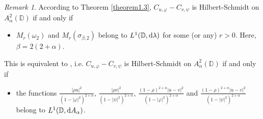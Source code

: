 \documentclass[preprint,12pt,times]{elsarticle}
\theoremstyle{definition}
\theoremstyle{remark}
\newtheorem{remark}[theorem]{Remark}
\numberwithin{equation}{section}
\begin{document}
\begin{remark}\label{remark4.1}
According to Theorem \ref{theorem1.3}, $C_{u,\varphi}-C_{v,\psi}$ is Hilbert-Schmidt on $A_{\alpha}^2(\mathbb{D})$ if and only if
\begin{itemize}
\item[(a)] $M_r(\omega_{2})$ and $M_r(\sigma_{\beta,2})$ belong to $L^1(\mathbb{D},{\rm d}\lambda)$ for some (or any) $r>0$. Here, $\beta=2(2+\alpha)$.
\end{itemize}
This is equivalent to \cite[Theorem 2]{1}, i.e. $C_{u,\varphi}-C_{v,\psi}$ is Hilbert-Schmidt on $A_{\alpha}^2(\mathbb{D})$ if and only if 
\begin{itemize}
\item[(b)] the functions $\frac{|\rho u|^2}{(1-|\varphi|^2)^{2+\alpha}}$, $\frac{|\rho v|^2}{(1-|\psi|^2)^{2+\alpha}}$, $\frac{(1-\rho)^{2+\alpha}|u-v|^2}{(1-|\varphi|^2)^{2+\alpha}}$ and $\frac{(1-\rho)^{2+\alpha}|u-v|^2}{(1-|\psi|^2)^{2+\alpha}}$ belong to $L^1(\mathbb{D},{\rm d}A_{\alpha})$.
\end{itemize}


\end{remark}
\end{document}
